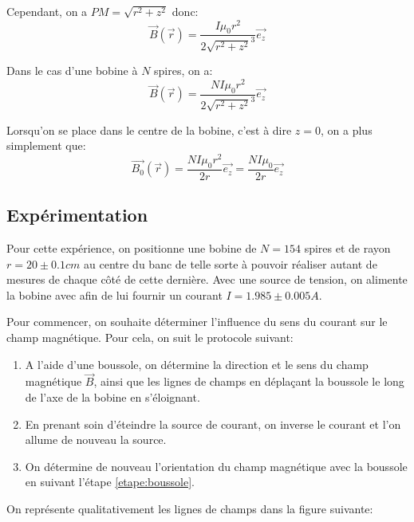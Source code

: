 \documentclass[12pt]{article}
\begin{document}
Cependant, on a $PM = \sqrt{r^2 + z^2}$ donc:
\begin{equation}
    \vec{B}(\vec{r}) = \frac{I \mu_0 r^2}{2 \sqrt{r^2 + z^2}^3} \vec{e_z}
\end{equation}

Dans le cas d'une bobine à $N$ spires, on a:
\begin{equation}
    \label{eqn:champ_magn_z}
    \vec{B}(\vec{r}) = \frac{N I \mu_0 r^2}{2 \sqrt{r^2 + z^2}^3} \vec{e_z}
\end{equation}

Lorsqu'on se place dans le centre de la bobine, c'est à dire $z = 0$, on a plus simplement que:
\begin{equation}
    \label{eqn:champ_magn_0}
    \vec{B_0}(\vec{r}) = \frac{NI \mu_0 r^2}{2r} \vec{e_z} = \frac{NI \mu_0}{2r} \vec{e_z}
\end{equation}

\newpage
\subsection{Expérimentation}
Pour cette expérience, on positionne une bobine de $N = 154$ spires et de rayon $r = 20 \pm 0.1 cm$ au centre du banc de telle sorte à pouvoir réaliser
autant de mesures de chaque côté de cette dernière. Avec une source de tension, on alimente la bobine avec 
afin de lui fournir un courant $I = 1.985 \pm 0.005A$.

Pour commencer, on souhaite déterminer l'influence du sens du courant sur le champ magnétique. Pour cela, on suit le protocole
suivant:

\begin{enumerate}
    \item A l'aide d'une boussole, on détermine la direction et le sens du champ magnétique $\vec{B}$, ainsi que les lignes de champs
    en déplaçant la boussole le long de l'axe de la bobine en s'éloignant. \label{etape:boussole}
    \item En prenant soin d'éteindre la source de courant, on inverse le courant et l'on allume de nouveau la source.
    \item On détermine de nouveau l'orientation du champ magnétique avec la boussole en suivant l'étape \ref{etape:boussole}. 
\end{enumerate}

On représente qualitativement les lignes de champs dans la figure suivante:
\end{document}
